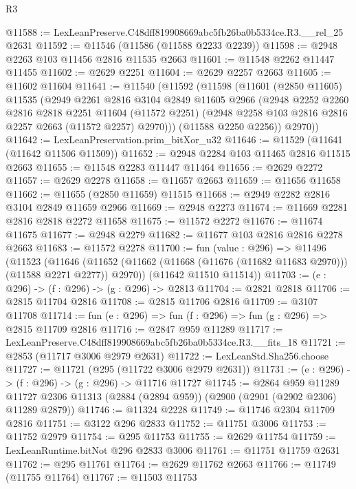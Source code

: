 \begin{lexlean}{R3}
\begin{coremodule}
@11588 := LexLeanPreserve.C48dff819908669abc5fb26ba0b5334ce.R3.__rel_25 @2631
@11592 := @11546 (@11586 (@11588 @2233 @2239))
@11598 := @2948 @2263 @103 @11456 @2816 @11535 @2663
@11601 := @11548 @2262 @11447 @11455
@11602 := @2629 @2251
@11604 := @2629 @2257 @2663
@11605 := @11602 @11604
@11641 := @11540
    (@11592
      (@11598
        (@11601
          (@2850 @11605)
          @11535
          (@2949
            @2261
            @2816
            @3104
            @2849
            @11605
            @2966
            (@2948
              @2252
              @2260
              @2816
              @2818
              @2251
              @11604
              (@11572 @2251)
              (@2948 @2258 @103 @2816 @2816 @2257 @2663 (@11572 @2257) @2970)))
          (@11588 @2250 @2256))
        @2970))
@11642 := LexLeanPreservation.prim_bitXor_u32
@11646 := @11529 (@11641 (@11642 @11506 @11509))
@11652 := @2948 @2284 @103 @11465 @2816 @11515 @2663
@11655 := @11548 @2283 @11447 @11464
@11656 := @2629 @2272
@11657 := @2629 @2278
@11658 := @11657 @2663
@11659 := @11656 @11658
@11662 := @11655 (@2850 @11659) @11515
@11668 := @2949 @2282 @2816 @3104 @2849 @11659 @2966
@11669 := @2948 @2273
@11674 := @11669 @2281 @2816 @2818 @2272 @11658
@11675 := @11572 @2272
@11676 := @11674 @11675
@11677 := @2948 @2279
@11682 := @11677 @103 @2816 @2816 @2278 @2663
@11683 := @11572 @2278
@11700 := fun (value : @296) =>
  @11496
    (@11523
      (@11646 (@11652 (@11662 (@11668 (@11676 (@11682 @11683 @2970))) (@11588 @2271 @2277)) @2970))
      (@11642 @11510 @11514))
@11703 := (e : @296) -> (f : @296) -> (g : @296) -> @2813
@11704 := @2821 @2818
@11706 := @2815 @11704 @2816
@11708 := @2815 @11706 @2816
@11709 := @3107 @11708
@11714 := fun (e : @296) => fun (f : @296) => fun (g : @296) => @2815 @11709 @2816
@11716 := @2847 @959 @11289
@11717 := LexLeanPreserve.C48dff819908669abc5fb26ba0b5334ce.R3.__fits_18
@11721 := @2853 (@11717 @3006 @2979 @2631)
@11722 := LexLeanStd.Sha256.choose
@11727 := @11721 (@295 (@11722 @3006 @2979 @2631))
@11731 := (e : @296) -> (f : @296) -> (g : @296) -> @11716 @11727
@11745 := @2864
    @959
    @11289
    @11727
    @2306
    @11313
    (@2884 (@2894 @959))
    (@2900 (@2901 (@2902 @2306) @11289 @2879))
@11746 := @11324 @2228
@11749 := @11746 @2304 @11709 @2816
@11751 := @3122 @296 @2833
@11752 := @11751 @3006
@11753 := @11752 @2979
@11754 := @295 @11753
@11755 := @2629 @11754
@11759 := LexLeanRuntime.bitNot @296 @2833 @3006
@11761 := @11751 @11759 @2631
@11762 := @295 @11761
@11764 := @2629 @11762 @2663
@11766 := @11749 (@11755 @11764)
@11767 := @11503 @11753

\end{coremodule}
\end{lexlean}
